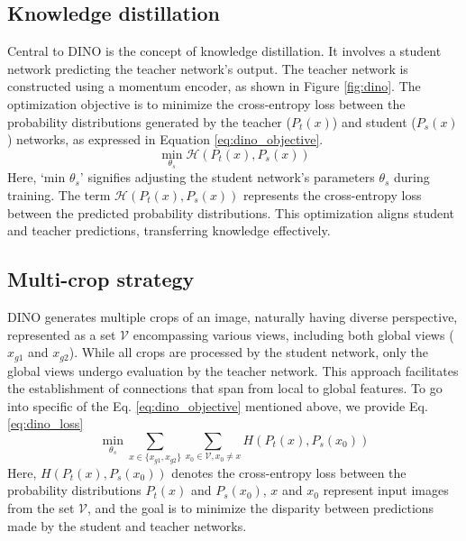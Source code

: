 \subsection{Knowledge distillation}
Central to DINO is the concept of knowledge distillation. It involves a student network predicting the teacher network's output. The teacher network is constructed using a momentum encoder, as shown in Figure \ref{fig:dino}. The optimization objective is to minimize the cross-entropy loss between the probability distributions generated by the teacher ($P_t(x)$) and student ($P_s(x)$) networks, as expressed in Equation \ref{eq:dino_objective}.
\begin{equation}
\label{eq:dino_objective}
\min_{\theta_s} \mathcal{H}(P_t(x), P_s(x))
\end{equation}
Here, `min \( \theta_s \)' signifies adjusting the student network's parameters \( \theta_s \) during training. The term \( \mathcal{H}(P_t(x), P_s(x)) \) represents the cross-entropy loss between the predicted probability distributions. This optimization aligns student and teacher predictions, transferring knowledge effectively.

\subsection{Multi-crop strategy}
DINO generates multiple crops of an image, naturally having diverse perspective, represented as a set $\mathcal{V}$ encompassing various views, including both global views ($x_{g1}$ and $x_{g2}$). While all crops are processed by the student network, only the global views undergo evaluation by the teacher network. This approach facilitates the establishment of connections that span from local to global features. To go into specific of the Eq. \ref{eq:dino_objective} mentioned above, we provide Eq. \ref{eq:dino_loss}
\begin{equation}
\label{eq:dino_loss}
\min_{\theta_s} \sum_{x \in \{x_{g1},x_{g2}\}} \sum_{x_0 \in \mathcal{V}, x_0 \neq x} H(P_t(x), P_s(x_0))
\end{equation}
Here, $H(P_t(x),P_s(x_0))$ denotes the cross-entropy loss between the probability distributions $P_t(x)$  and $P_s(x_0)$, $x$ and $x_0$ represent input images from the set $\mathcal{V}$, and the goal is to minimize the disparity between predictions made by the student and teacher networks. 


